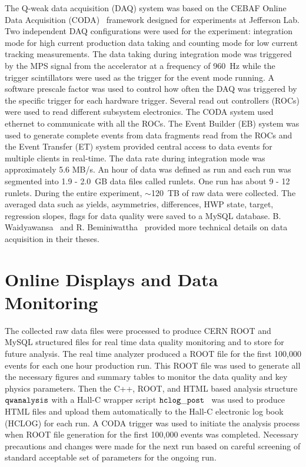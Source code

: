 The Q-weak data acquisition (DAQ) system was based on the CEBAF Online Data Acquisition (CODA)~\cite{website:CODA_wiki,Banta:1997ac} framework designed for experiments at Jefferson Lab. Two independent DAQ configurations were used for the experiment: integration mode for high current production data taking and counting mode for low current tracking measurements. The data taking during integration mode was triggered by the MPS signal from the accelerator at a frequency of 960~Hz while the trigger scintillators were used as the trigger for the event mode running. A software prescale factor was used to control how often the DAQ was triggered by the specific trigger for each hardware trigger. Several read out controllers (ROCs) were used to read different subsystem electronics. The CODA system used ethernet to communicate with all the ROCs. The Event Builder (EB) system was used to generate complete events from data fragments read from the ROCs and the Event Transfer (ET) system provided central access to data events for multiple clients in real-time. The data rate during integration mode was approximately 5.6 MB/s.  An hour of data was defined as run and each run was segmented into 1.9 - 2.0~GB data files called runlets. One run has about 9 - 12 runlets. During the entire experiment, $\sim$120~TB of raw data were collected. The averaged data such as yields, asymmetries, differences, HWP state, target, regression slopes, flags for data quality were saved to a MySQL database. 
B. Waidyawansa~\cite{buddhini_qweak} and R. Beminiwattha~\cite{rakitha_qweak} provided more technical details on data acquisition in their theses.


\section{Online Displays and Data Monitoring}%
\label{Online Displays and Data Monitoring}

The collected raw data files were processed to produce CERN ROOT and MySQL structured files for real time data quality monitoring and to store for future analysis. The real time analyzer produced a ROOT file for the first 100,000 events for each one hour production run. This ROOT file was used to generate all the necessary figures and summary tables to monitor the data quality and key physics parameters. Then the C++, ROOT, and HTML based analysis structure ${ \tt qwanalysis}$ with a Hall-C wrapper script ${\tt hclog\_post}$~\cite{brads_communication} was used to produce HTML files and upload them automatically to the Hall-C electronic log book (HCLOG) for each run. A CODA trigger was used to initiate the analysis process when ROOT file generation for the first 100,000 events was completed. Necessary precautions and changes were made for the next run based on careful screening of standard acceptable set of parameters for the ongoing run.

